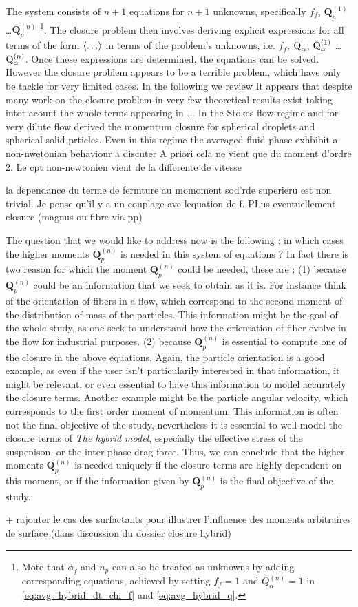 The system consists of $n+1$ equations for $n+1$ unknowns, specifically $f_f$, $\textbf{Q}_p^{(1)}$\ldots$\textbf{Q}_p^{(n)}$ \footnote{Mote that $\phi_f$ and $n_p$ can also be treated as unknowns by adding corresponding equations, achieved by setting $f_f=1$ and $Q_\alpha^{(n)} =1$ in \ref{eq:avg_hybrid_dt_chi_f} and \ref{eq:avg_hybrid_q}.}.
The closure problem then involves deriving explicit expressions for all terms of the form $\left<\ldots\right>$ in terms of the problem's unknowns, i.e. 
$f_f$, $\text Q_\alpha$, $\text Q_\alpha^{(1)}$ \ldots $ \text Q_\alpha^{(n)}$.  
Once these expressions are determined, the equations can be solved. 
However the closure problem appears to be a terrible problem, which have only be tackle for very limited cases. In the following we review  
It appears that despite many work on the closure problem in  very few theoretical results exist taking intot acount the whole terms appearing in ... 
In the Stokes flow regime and for very dilute flow \citep{jackson1997locally,zhang1997momentum} derived the momentum closure for spherical droplets and spherical solid prticles. 
Even in this regime the averaged fluid phase exhbibit a non-nwetonian behaviour a discuter
A priori cela ne vient que du moment d'ordre 2. Le cpt non-newtonien vient de la differente de vitesse

la dependance du terme de fermture au momoment sod'rde superieru est non trivial. Je pense qu'il y a un couplage ave lequation de f. PLus eventuellement closure (magnus ou fibre via pp)


The question that we would like to address now is the following : in which cases the higher moments $\textbf{Q}_p^{(n)}$ is needed in this system of equations ?
In fact there is two reason for which the moment $\textbf{Q}_p^{(n)}$ could be needed, these are : 
(1) because $\textbf{Q}_p^{(n)}$ could be an information that we seek to obtain as it is.
For instance think of the orientation of fibers in a flow, which correspond to the second moment of the distribution of mass of the particles.  
This information might be the goal of the whole study, as one seek to understand how the orientation of fiber evolve in the flow for industrial purposes. 
(2) because $\textbf{Q}_p^{(n)}$ is essential to compute one of the closure in the above equations. 
Again, the particle orientation is a good example, as even if the user isn't particularily interested in that information, it might be relevant, or even essential to have this information to model accurately the closure terms. 
Another example might be the particle angular velocity, which corresponds to the first order moment of momentum. 
This information is often not the final objective of the study, nevertheless it is essential to well model the closure terms of \textit{The hybrid model}, especially the effective stress of the suspenison, or the inter-phase drag force. 
Thus, we can conclude that the higher moments $\textbf{Q}_p^{(n)}$ is needed uniquely if the closure terms are highly dependent on this moment, or if the information given by $\textbf{Q}_p^{(n)}$ is the final objective of the study. 

+ rajouter le cas des surfactants pour illustrer l'influence des moments arbitraires de surface (dans discussion du dossier closure hybrid)



